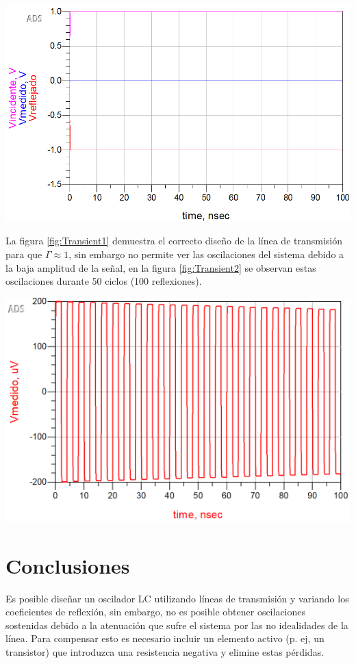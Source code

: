 \documentclass{article}   %
\theoremstyle{mytheoremstyle}
\theoremstyle{mytheoremstyle}
\theoremstyle{myproblemstyle}
\begin{document}
    \begin{minipage}{0.49\textwidth}   %
        \includegraphics[width=\linewidth]{figures/Tran1.png}
        \label{fig:Transient1}

        La figura \ref{fig:Transient1} demuestra el correcto diseño de la línea de transmisión para que $\Gamma \approx 1$, sin embargo 
        no permite ver las oscilaciones del sistema debido a la baja amplitud de la señal, en la figura \ref{fig:Transient2} se observan
        estas oscilaciones durante 50 ciclos (100 reflexiones).
        
        \includegraphics[width=\linewidth]{figures/Tran2.png}
        \label{fig:Transient2}

        {\centering\section*{\large Conclusiones}}
        Es posible diseñar un oscilador LC utilizando líneas de transmisión y variando los coeficientes de reflexión, sin embargo, no es 
        posible obtener oscilaciones sostenidas debido a la atenuación que sufre el sistema por las no idealidades de la línea. Para
        compensar esto es necesario incluir un elemento activo (p. ej, un transistor) que introduzca una resistencia negativa y elimine estas pérdidas.

    \end{minipage}
\end{document}
